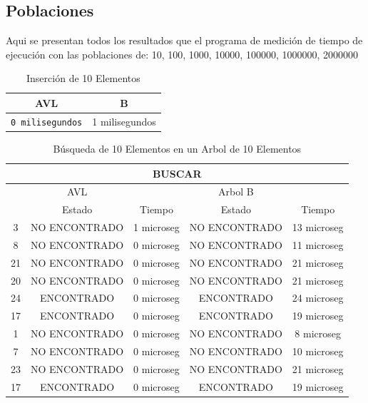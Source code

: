 \documentclass[acmsmall]{acmart}
\begin{document}
\subsection{Poblaciones}
Aqui se presentan todos los resultados que el programa de medición de tiempo de ejecución con las poblaciones de: 10, 100, 1000, 10000, 100000, 1000000, 2000000

\begin{table}[htbp]
\begin{center}
  \caption{Inserción de 10 Elementos}
  \begin{tabular}{cc}
    \toprule
    AVL & B\\
    \midrule
    \texttt{0 milisegundos} & 1 milisegundos \\
    \bottomrule
  \end{tabular}
  \end{center}
\end{table}

\begin{table}[htbp]
\begin{center}
  \caption{Búsqueda de 10 Elementos en un Arbol de 10 Elementos}
  \begin{tabular}{ccccc}
    \toprule
    \multicolumn{5}{c}{BUSCAR}\\
    \midrule
     \, & AVL &\, & Arbol B& \,\\
     \, &Estado&Tiempo&Estado&Tiempo \\
      3 &  NO ENCONTRADO  &1 microseg&NO ENCONTRADO&13 microseg \\
      8 &  NO ENCONTRADO  &0 microseg&NO ENCONTRADO&11 microseg \\
      21 &NO ENCONTRADO&0 microseg&NO ENCONTRADO&21 microseg \\
      20 & NO ENCONTRADO&0 microseg&NO ENCONTRADO&21 microseg \\
      24 &ENCONTRADO&0 microseg& ENCONTRADO&24 microseg \\
      17 & ENCONTRADO&0 microseg& ENCONTRADO&19 microseg \\
      1 & NO ENCONTRADO&0 microseg&NO ENCONTRADO&8 microseg \\
      7 & NO ENCONTRADO&0 microseg&NO ENCONTRADO&10 microseg \\
       23 & NO ENCONTRADO&0 microseg&NO ENCONTRADO&21 microseg \\
      17 &ENCONTRADO&0 microseg&ENCONTRADO&19 microseg \\

    \bottomrule
  \end{tabular}
  \end{center}
\end{table}
\end{document}
